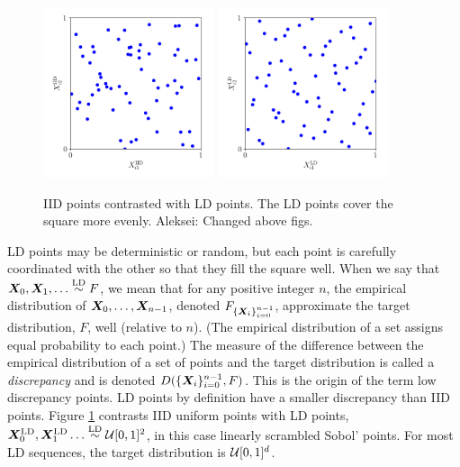 \documentclass[graybox,footinfo]{svmult}
\newcommand{\AGSComment}[1]{{\color{cyan} Aleksei: #1}}
\newcommand{\LD}{\textup{LD}}
\newcommand{\LDsim}{\overset{\LD}{\sim}}
\begin{document}
\begin{figure}
	\includegraphics[height=5cm]{ags/figs/dd.iid_uniform_pts.png}%
	\qquad
	\includegraphics[height=5cm]{ags/figs/dd.sobol_pts.png}%
	\caption{IID points contrasted with LD points.  The LD points cover the square more evenly. \AGSComment{Changed above figs.}} \label{fig:comparePts}
\end{figure}

LD points may be deterministic or random, but each point is carefully coordinated with the other so that they fill the square well.  When we say that $\bsX_0, \bsX_1, \ldots \LDsim F$, we mean that for any positive integer $n$,  the empirical distribution of ${\boldsymbol{X}}_0, \ldots, {\boldsymbol{X}}_{n-1}$, denoted $F_{\{{\boldsymbol{X}}_i\}_{i=0}^{n-1}}$,  approximate the target distribution, $F$, well (relative to $n$).  (The empirical distribution of a set assigns equal probability to each point.)  The measure of the difference between the empirical distribution of a set of points and the target distribution is called a \emph{discrepancy} and is denoted $D(\{{\boldsymbol{X}}_i\}_{i=0}^{n-1}, F)$.  This is the origin of the term low discrepancy points.  LD points by definition have a smaller discrepancy than IID points.  Figure \ref{fig:comparePts} contrasts IID uniform points with LD points, $\bsX^{\LD}_0, \bsX^{\LD}_1 \ldots \LDsim \calU[0,1]^2$, in this case linearly scrambled Sobol' points. For most LD sequences, the target distribution is ${\mathcal{U}}[0,1]^d$.
\end{document}
